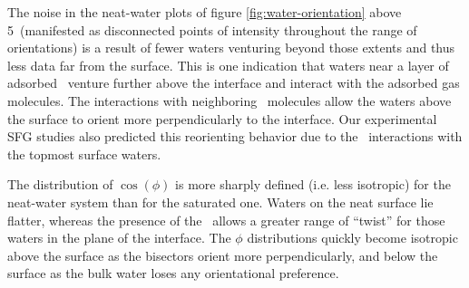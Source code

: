The noise in the neat-water plots of figure \ref{fig:water-orientation} above 5\angs~(manifested as disconnected points of intensity throughout the range of orientations) is a result of fewer waters venturing beyond those extents and thus less data far from the surface. This is one indication that waters near a layer of adsorbed \suldiox~venture further above the interface and interact with the adsorbed gas molecules. The interactions with neighboring \suldiox~molecules allow the waters above the surface to orient more perpendicularly to the interface. Our experimental SFG studies also predicted this reorienting behavior due to the \suldiox~interactions with the topmost surface waters.\cite{Ota2011}

The distribution of $\cos(\phi)$ is more sharply defined (i.e. less isotropic) for the neat-water system than for the saturated one. Waters on the neat surface lie flatter, whereas the presence of the \suldiox~allows a greater range of ``twist'' for those waters in the plane of the interface. The $\phi$ distributions quickly become isotropic above the surface as the bisectors orient more perpendicularly, and below the surface as the bulk water loses any orientational preference.


